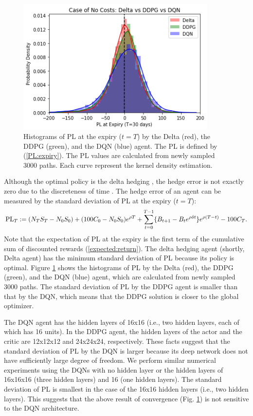 \documentclass[11pt]{article}
\begin{document}
\begin{figure}[tb]
	\begin{center}
		\includegraphics[width=10cm]{../fig/fig02.png}
		\caption{Histograms of PL at the expiry ($t=T$) by the Delta (red), the DDPG (green), and the DQN (blue) agent. The PL is defined by (\ref{PL:expiry}). The PL values are calculated from newly sampled 3000 paths. Each curve represent the kernel density estimation.}
		\label{fig02}
	\end{center}
\end{figure}

Although the optimal policy is the delta hedging \citep{Kolm:Ritter:2019}, the hedge error is not exactly zero due to the discreteness of time \citep{Derman:Miller:2016}. The hedge error of an agent can be measured by the standard deviation of PL at the expiry ($t = T$):
%
\begin{equation}
	{\rm PL}_T := (N_T S_T - N_0 S_0) + (100 C_0 - N_0 S_0) e^{\rho T}
	+ \sum_{t=0}^{T-1} \{B_{t+1} - B_t e^{\rho \delta t}\} e^{\rho (T-t)} - 100 C_T. \label{PL:expiry}
\end{equation}
%
Note that the expectation of PL at the expiry is the first term of the cumulative sum of discounted rewards (\ref{expected:return}). The delta hedging agent (shortly, Delta agent) has the minimum standard deviation of PL because its policy is optimal. Figure \ref{fig02} shows the histograms of PL by the Delta (red), the DDPG (green), and the DQN (blue) agent, which are calculated from newly sampled 3000 paths. The standard deviation of PL by the DDPG agent is smaller than that by the DQN, which means that the DDPG solution is closer to the global optimizer.

The DQN agent has the hidden layers of 16x16 (i.e., two hidden layers, each of which has 16 units). In the DDPG agent, the hidden layers of the actor and the critic are 12x12x12 and 24x24x24, respectively. These facts suggest that the standard deviation of PL by the DQN is larger because its deep network does not have sufficiently large degree of freedom. We perform similar numerical experiments using the DQNs with no hidden layer or the hidden layers of 16x16x16 (three hidden layers) and 16 (one hidden layers). The standard deviation of PL is smallest in the case of the 16x16 hidden layers (i.e., two hidden layers). This suggests that the above result of convergence (Fig. \ref{fig02}) is not sensitive to the DQN architecture.
\end{document}
